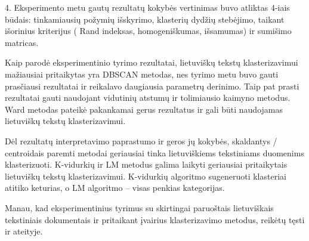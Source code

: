 \documentclass{VUMIFInfKursinis}
\begin{document}
4. Eksperimento metu gautų rezultatų kokybės vertinimas buvo atliktas
4-iais būdais: tinkamiausių požymių išskyrimo, klasterių dydžių
stebėjimo, taikant išorinius kriterijus ( Rand indeksas, homogeniškumas,
išsamumas) ir sumišimo matricas.

Kaip parodė eksperimentinio tyrimo rezultatai, lietuviškų tekstų
klasterizavimui mažiausiai pritaikytas yra DBSCAN metodas, nes tyrimo
metu buvo gauti prasčiausi rezultatai ir reikalavo daugiausia parametrų
derinimo. Taip pat prasti rezultatai gauti naudojant vidutinių atstumų
ir tolimiausio kaimyno metodus. Ward metodas pateikė pakankamai gerus
rezultatus ir gali būti naudojamas lietuviškų tekstų klasterizavimui.

Dėl rezultatų interpretavimo paprastumo ir geros jų kokybės, skaldantys
/ centroidais paremti metodai geriausiai tinka lietuviškiems tekstiniams
duomenims klasterizuoti. K-vidurkių ir LM metodus galima laikyti
geriausiai pritaikytais lietuviškų tekstų klasterizavimui. K-vidurkių
algoritmo sugeneruoti klasteriai atitiko keturias, o LM algoritmo –
visas penkias kategorijas.

Manau, kad eksperimentinius tyrimus su skirtingai paruoštais
lietuviškais tekstiniais dokumentais ir pritaikant įvairius
klasterizavimo metodus, reikėtų tęsti ir ateityje.











\printbibliography[heading=bibintoc]

\appendix
\end{document}
